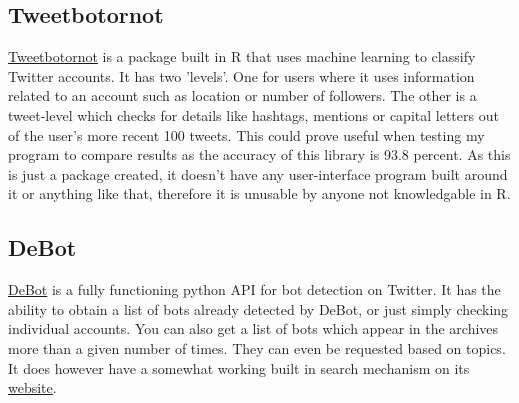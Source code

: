 \subsection{Tweetbotornot}
\href{https://github.com/mkearney/tweetbotornot}{Tweetbotornot} is a package built in R that uses machine learning to classify Twitter accounts. It has two 'levels'. One for users where it uses information related to an account such as location or number of followers. The other is a tweet-level which checks for details like hashtags, mentions or capital letters out of the user's more recent 100 tweets. 
This could prove useful when testing my program to compare results as the accuracy of this library is 93.8 percent. As this is just a package created, it doesn't have any user-interface program built around it or anything like that, therefore it is unusable by anyone not knowledgable in R. 

\subsection{DeBot}
\href{https://github.com/nchavoshi/debot_api}{DeBot} is a fully functioning python API for bot detection on Twitter. It has the ability to obtain a list of bots already detected by DeBot, or just simply checking individual accounts. You can also get a list of bots which appear in the archives more than a given number of times. They can even be requested based on topics. It does however have a somewhat working built in search mechanism on its \href{https://www.cs.unm.edu/~chavoshi/debot/}{website}.
